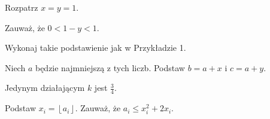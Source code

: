 
\begin{hints_list}
	\item Rozpatrz $x = y = 1$.
	\item Zauważ, że $0 < 1 - y < 1$.
	\item Wykonaj takie podstawienie jak w Przykładzie 1.
	\item Niech $a$ będzie najmniejszą z tych liczb. Podstaw $b = a + x$ i $c = a + y$.
	\item Jedynym działającym $k$ jest $\frac{3}{4}$.
	\item Podstaw $x_i = \left\lfloor a_i \right\rfloor$. Zauważ, że $a_i \leqslant x_i^2 + 2x_i$.
\end{hints_list}